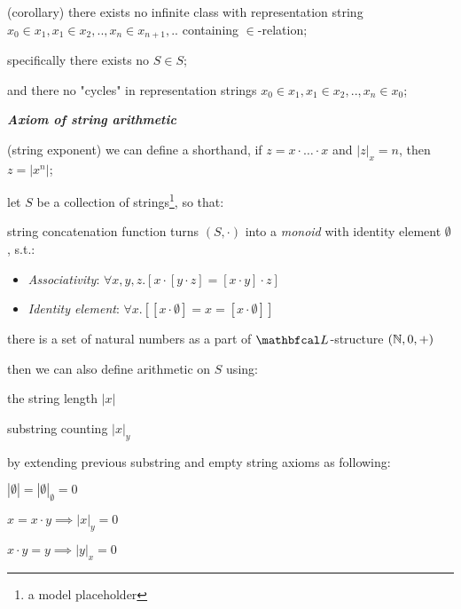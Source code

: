\begin{definition}
\begin{legal}
\begin{legal}
      \item (corollary) there exists no infinite class with representation string $x_0 \in x_1,x_1 \in x_2, .. ,x_{n} \in x_{n+1}, ..$ containing $\in$-relation;
      \item specifically there exists no $S \in S$;
      \item and there no "cycles" in representation strings $x_0 \in x_1 , x_1 \in x_2 , .. , x_{n} \in x_0$;
    \end{legal}
    \item \textbf{\textit{Axiom of string arithmetic}}
    \begin{legal}
      \item (string exponent) we can define a shorthand, if $z = x \cdot \dots \cdot x$ and $|z|_x = n$, then $z = |x^n|$;
      \item let $S$ be a collection of strings\footnote{a model placeholder}, so that: 
      \begin{legal}
        \item string concatenation function turns $(S, \cdot)$ into a \textit{monoid} with identity element $\emptyset$, s.t.:
          \begin{itemize}
            \item \textit{Associativity}: $\forall x,y,z.[x \cdot [y \cdot z] = [x \cdot y] \cdot z]$
            \item \textit{Identity element}: $\forall x.[[x \cdot \emptyset] = x = [x \cdot \emptyset]]$
          \end{itemize}
        \item there is a set of natural numbers as a part of $\lsign$-structure $(\mathbb{N}, 0, +)$
      \end{legal}
      \item then we can also define arithmetic on $S$ using:
      \begin{legal}
        \item the string length $|x|$
        \item substring counting $|x|_y$
      \end{legal}
      by extending previous substring and empty string axioms as following:
      \begin{legal}
        \item $|\emptyset| = |\emptyset|_\emptyset = 0$
        \item $x = x \cdot y \implies |x|_y = 0$
        \item $x \cdot y = y \implies |y|_x = 0$

\end{legal}
\end{legal}
\end{legal}
\end{definition}
